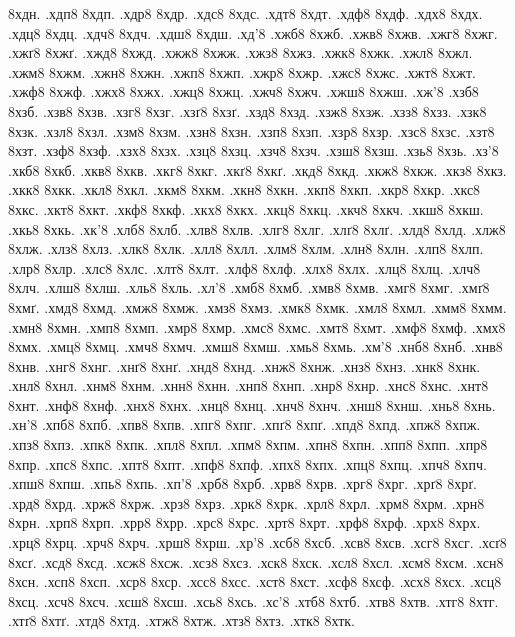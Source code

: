 {8хдн.
.хдп8
8хдп.
.хдр8
8хдр.
.хдс8
8хдс.
.хдт8
8хдт.
.хдф8
8хдф.
.хдх8
8хдх.
.хдц8
8хдц.
.хдч8
8хдч.
.хдш8
8хдш.
.хд'8
.хжб8
8хжб.
.хжв8
8хжв.
.хжг8
8хжг.
.хжґ8
8хжґ.
.хжд8
8хжд.
.хжж8
8хжж.
.хжз8
8хжз.
.хжк8
8хжк.
.хжл8
8хжл.
.хжм8
8хжм.
.хжн8
8хжн.
.хжп8
8хжп.
.хжр8
8хжр.
.хжс8
8хжс.
.хжт8
8хжт.
.хжф8
8хжф.
.хжх8
8хжх.
.хжц8
8хжц.
.хжч8
8хжч.
.хжш8
8хжш.
.хж'8
.хзб8
8хзб.
.хзв8
8хзв.
.хзг8
8хзг.
.хзґ8
8хзґ.
.хзд8
8хзд.
.хзж8
8хзж.
.хзз8
8хзз.
.хзк8
8хзк.
.хзл8
8хзл.
.хзм8
8хзм.
.хзн8
8хзн.
.хзп8
8хзп.
.хзр8
8хзр.
.хзс8
8хзс.
.хзт8
8хзт.
.хзф8
8хзф.
.хзх8
8хзх.
.хзц8
8хзц.
.хзч8
8хзч.
.хзш8
8хзш.
.хзь8
8хзь.
.хз'8
.хкб8
8хкб.
.хкв8
8хкв.
.хкг8
8хкг.
.хкґ8
8хкґ.
.хкд8
8хкд.
.хкж8
8хкж.
.хкз8
8хкз.
.хкк8
8хкк.
.хкл8
8хкл.
.хкм8
8хкм.
.хкн8
8хкн.
.хкп8
8хкп.
.хкр8
8хкр.
.хкс8
8хкс.
.хкт8
8хкт.
.хкф8
8хкф.
.хкх8
8хкх.
.хкц8
8хкц.
.хкч8
8хкч.
.хкш8
8хкш.
.хкь8
8хкь.
.хк'8
.хлб8
8хлб.
.хлв8
8хлв.
.хлг8
8хлг.
.хлґ8
8хлґ.
.хлд8
8хлд.
.хлж8
8хлж.
.хлз8
8хлз.
.хлк8
8хлк.
.хлл8
8хлл.
.хлм8
8хлм.
.хлн8
8хлн.
.хлп8
8хлп.
.хлр8
8хлр.
.хлс8
8хлс.
.хлт8
8хлт.
.хлф8
8хлф.
.хлх8
8хлх.
.хлц8
8хлц.
.хлч8
8хлч.
.хлш8
8хлш.
.хль8
8хль.
.хл'8
.хмб8
8хмб.
.хмв8
8хмв.
.хмг8
8хмг.
.хмґ8
8хмґ.
.хмд8
8хмд.
.хмж8
8хмж.
.хмз8
8хмз.
.хмк8
8хмк.
.хмл8
8хмл.
.хмм8
8хмм.
.хмн8
8хмн.
.хмп8
8хмп.
.хмр8
8хмр.
.хмс8
8хмс.
.хмт8
8хмт.
.хмф8
8хмф.
.хмх8
8хмх.
.хмц8
8хмц.
.хмч8
8хмч.
.хмш8
8хмш.
.хмь8
8хмь.
.хм'8
.хнб8
8хнб.
.хнв8
8хнв.
.хнг8
8хнг.
.хнґ8
8хнґ.
.хнд8
8хнд.
.хнж8
8хнж.
.хнз8
8хнз.
.хнк8
8хнк.
.хнл8
8хнл.
.хнм8
8хнм.
.хнн8
8хнн.
.хнп8
8хнп.
.хнр8
8хнр.
.хнс8
8хнс.
.хнт8
8хнт.
.хнф8
8хнф.
.хнх8
8хнх.
.хнц8
8хнц.
.хнч8
8хнч.
.хнш8
8хнш.
.хнь8
8хнь.
.хн'8
.хпб8
8хпб.
.хпв8
8хпв.
.хпг8
8хпг.
.хпґ8
8хпґ.
.хпд8
8хпд.
.хпж8
8хпж.
.хпз8
8хпз.
.хпк8
8хпк.
.хпл8
8хпл.
.хпм8
8хпм.
.хпн8
8хпн.
.хпп8
8хпп.
.хпр8
8хпр.
.хпс8
8хпс.
.хпт8
8хпт.
.хпф8
8хпф.
.хпх8
8хпх.
.хпц8
8хпц.
.хпч8
8хпч.
.хпш8
8хпш.
.хпь8
8хпь.
.хп'8
.хрб8
8хрб.
.хрв8
8хрв.
.хрг8
8хрг.
.хрґ8
8хрґ.
.хрд8
8хрд.
.хрж8
8хрж.
.хрз8
8хрз.
.хрк8
8хрк.
.хрл8
8хрл.
.хрм8
8хрм.
.хрн8
8хрн.
.хрп8
8хрп.
.хрр8
8хрр.
.хрс8
8хрс.
.хрт8
8хрт.
.хрф8
8хрф.
.хрх8
8хрх.
.хрц8
8хрц.
.хрч8
8хрч.
.хрш8
8хрш.
.хр'8
.хсб8
8хсб.
.хсв8
8хсв.
.хсг8
8хсг.
.хсґ8
8хсґ.
.хсд8
8хсд.
.хсж8
8хсж.
.хсз8
8хсз.
.хск8
8хск.
.хсл8
8хсл.
.хсм8
8хсм.
.хсн8
8хсн.
.хсп8
8хсп.
.хср8
8хср.
.хсс8
8хсс.
.хст8
8хст.
.хсф8
8хсф.
.хсх8
8хсх.
.хсц8
8хсц.
.хсч8
8хсч.
.хсш8
8хсш.
.хсь8
8хсь.
.хс'8
.хтб8
8хтб.
.хтв8
8хтв.
.хтг8
8хтг.
.хтґ8
8хтґ.
.хтд8
8хтд.
.хтж8
8хтж.
.хтз8
8хтз.
.хтк8
8хтк.
}
